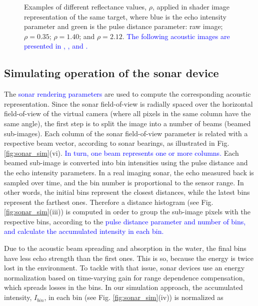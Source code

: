 \documentclass[final,5p,times]{elsarticle}
\begin{document}
\begin{figure}[!ht]
{        \label{fig:reflectance:view:2_12}
    }
    \captionsetup{justification=justified}
    \caption{Examples of different reflectance values, $\rho$, applied in
    shader image representation of the same target, where blue is the echo intensity parameter and green is the pulse distance parameter:  raw image;
     $\rho = 0.35$;
     $\rho = 1.40$; and
     $\rho = 2.12$. \textcolor{blue}{The following
    acoustic images are presented in ,
    , 
    and .}}
    \label{fig:sonar_reflectances}
\end{figure}


\subsection{Simulating operation of the sonar device}
\label{dev:sonardata}

The \textcolor{blue}{sonar rendering parameters} are used to compute the corresponding acoustic representation. Since the sonar field-of-view is radially spaced over the horizontal field-of-view of the virtual camera (where all pixels in the same column have the same angle), the first step is to split the image into a number of beams (beamed sub-images). Each column of the sonar field-of-view parameter is related with a respective beam vector, according to sonar bearings, as illustrated in Fig. \ref{fig:sonar_sim}(vi).
\textcolor{blue}{In turn, one beam represents one or more columns.} Each
beamed sub-image is converted into bin intensities using the pulse distance and the echo intensity parameters. In a real imaging sonar, the echo
measured back is sampled
over time, and the bin number is proportional to the sensor range. In other
words, the initial bins represent the closest distances, while the latest
bins represent the farthest ones. Therefore a distance histogram (see Fig. \ref{fig:sonar_sim}(iii)) is computed in order to
group the sub-image pixels with the respective bins, according to the \textcolor{blue}{pulse distance parameter and number of bins,
and calculate the accumulated intensity in each bin.}

Due to the acoustic beam spreading and absorption in the water, the final
bins have less echo strength than the first ones. This is so, because the energy is
twice lost in the environment. To tackle with that issue, sonar devices
use an energy normalization based on time-varying gain for range dependence
compensation, which spreads losses in the bins. In our simulation approach,
the accumulated intensity, $I_{bin}$, in each bin (see Fig. \ref{fig:sonar_sim}(iv)) is normalized as
\end{document}
